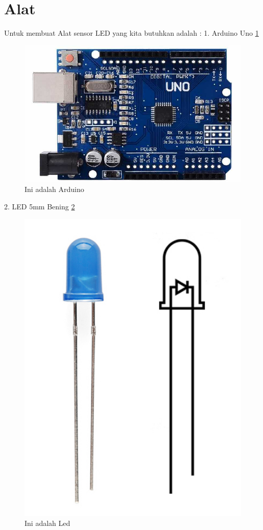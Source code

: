 \documentclass{article}
\begin{document}
\section{Alat}
Untuk membuat Alat sensor LED yang kita butuhkan adalah :
 1. Arduino Uno
 \ref{arduino}
  \begin{figure}[ht]
  \centerline{\includegraphics[width=1\textwidth]{../figures/arduino10.jpg}}
  \caption{Ini adalah Arduino}
  \label{arduino}
  \end{figure}

 2. LED 5mm Bening
 \ref{led}
  \begin{figure}[ht]
  \centerline{\includegraphics[width=1\textwidth]{../figures/led10.jpg}}
  \caption{Ini adalah Led}
  \label{led}
  \end{figure}
\end{document}
